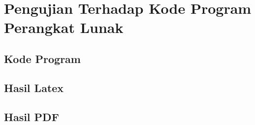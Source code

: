 \chapter{Pengujian Terhadap Kode Program Perangkat Lunak}
\label{lamp:B}

\section{Kode Program}
\label{kodeProgram:B}




\section{Hasil Latex}
\label{hasilLatex:B}

\section{Hasil PDF}
\label{hasilPDF:B}



